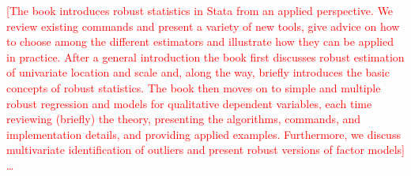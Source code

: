 \stbkpreface

\textcolor{red}{[The book introduces robust statistics in Stata from an
applied perspective. We review existing commands and present a variety of new
tools, give advice on how to choose among the different estimators and
illustrate how they can be applied in practice. After a general introduction
the book first discusses robust estimation of univariate location and scale
and, along the way, briefly introduces the basic concepts of robust statistics.
The book then moves on to simple and multiple robust regression and models for
qualitative dependent variables, each time reviewing (briefly) the theory,
presenting the algorithms, commands, and implementation details, and providing
applied examples. Furthermore, we discuss multivariate identification of
outliers and present robust versions of factor models] \dots}
